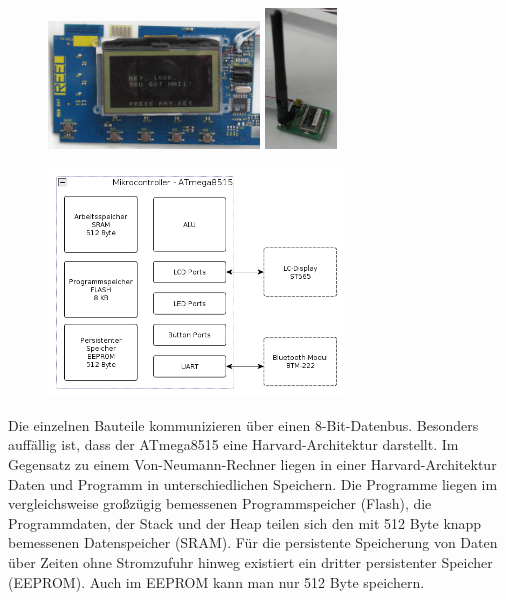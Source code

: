 \documentclass[ngerman]{article}
\begin{document}
\begin{figure}[h!] \begin{center}
    \includegraphics[width=0.5\textwidth]{media/board}
    \includegraphics[width=0.17\textwidth]{media/bluetooth.jpg}
\end{center} \end{figure}

\begin{figure}[h!] \begin{center}
    \includegraphics[width=0.7\textwidth]{media/letterbox-atmega-arch}
\end{center} \end{figure}

Die einzelnen Bauteile kommunizieren über einen 8-Bit-Datenbus. Besonders
auffällig ist, dass der ATmega8515 eine Harvard-Architektur darstellt. Im
Gegensatz zu einem Von-Neumann-Rechner liegen in einer Harvard-Architektur
Daten und Programm in unterschiedlichen Speichern. Die Programme liegen im
vergleichsweise großzügig bemessenen Programmspeicher (Flash), die
Programmdaten, der Stack und der Heap teilen sich den mit 512 Byte knapp
bemessenen Datenspeicher (SRAM). Für die persistente Speicherung von Daten über
Zeiten ohne Stromzufuhr hinweg existiert ein dritter persistenter Speicher
(EEPROM). Auch im EEPROM kann man nur 512 Byte speichern.
\end{document}
